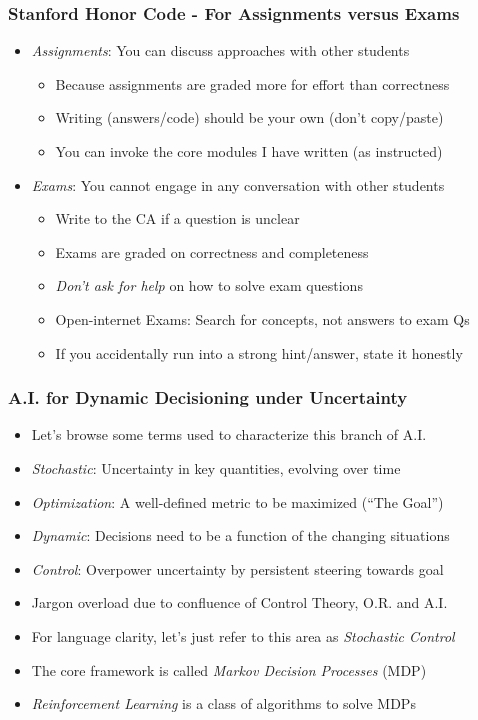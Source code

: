 \documentclass[handout]{beamer}
\begin{document}
\begin{frame}
\frametitle{Stanford Honor Code - For Assignments versus Exams}
\pause
\begin{itemize}[<+->]
\item {\em Assignments}: You can discuss approaches with other students
\begin{itemize}
\item Because assignments are graded more for effort than correctness
\item Writing (answers/code) should be your own (don't copy/paste)
\item You can invoke the core modules I have written (as instructed)
\end{itemize}
\item {\em Exams}: You cannot engage in any conversation with other students
\begin{itemize}
\item Write to the CA if a question is unclear
\item Exams are graded on correctness and completeness
\item  {\em Don't ask for help} on how to solve exam questions
\item Open-internet Exams: Search for concepts, not answers to exam Qs
\item If you accidentally run into a strong hint/answer, state it honestly
\end{itemize}
\end{itemize}
\end{frame}


\begin{frame}
\frametitle{A.I. for Dynamic Decisioning under Uncertainty}
\pause
\begin{itemize}[<+->]
\item Let's browse some terms used to characterize this branch of A.I.
\item {\em Stochastic}: Uncertainty in key quantities, evolving over time
\item {\em Optimization}: A well-defined metric to be maximized (``The Goal'')
\item {\em Dynamic}:  Decisions need to be a function of the changing situations
\item {\em Control}: Overpower uncertainty by persistent steering towards goal
\item Jargon overload due to confluence of Control Theory, O.R. and A.I.
\item For language clarity, let's just refer to this area as {\em Stochastic Control}
\item The core framework is called {\em Markov Decision Processes} (MDP)
\item {\em Reinforcement Learning} is a class of algorithms to solve MDPs
\end{itemize}
\end{frame}
\end{document}
